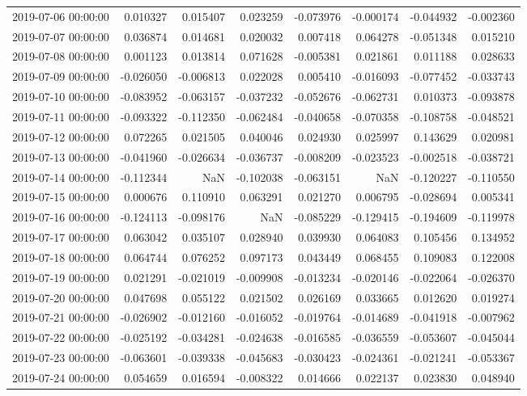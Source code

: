 \begin{tabular}{lrrrrrrr}
2019-07-06 00:00:00 & 0.010327 & 0.015407 & 0.023259 & -0.073976 & -0.000174 & -0.044932 & -0.002360 \\
2019-07-07 00:00:00 & 0.036874 & 0.014681 & 0.020032 & 0.007418 & 0.064278 & -0.051348 & 0.015210 \\
2019-07-08 00:00:00 & 0.001123 & 0.013814 & 0.071628 & -0.005381 & 0.021861 & 0.011188 & 0.028633 \\
2019-07-09 00:00:00 & -0.026050 & -0.006813 & 0.022028 & 0.005410 & -0.016093 & -0.077452 & -0.033743 \\
2019-07-10 00:00:00 & -0.083952 & -0.063157 & -0.037232 & -0.052676 & -0.062731 & 0.010373 & -0.093878 \\
2019-07-11 00:00:00 & -0.093322 & -0.112350 & -0.062484 & -0.040658 & -0.070358 & -0.108758 & -0.048521 \\
2019-07-12 00:00:00 & 0.072265 & 0.021505 & 0.040046 & 0.024930 & 0.025997 & 0.143629 & 0.020981 \\
2019-07-13 00:00:00 & -0.041960 & -0.026634 & -0.036737 & -0.008209 & -0.023523 & -0.002518 & -0.038721 \\
2019-07-14 00:00:00 & -0.112344 & NaN & -0.102038 & -0.063151 & NaN & -0.120227 & -0.110550 \\
2019-07-15 00:00:00 & 0.000676 & 0.110910 & 0.063291 & 0.021270 & 0.006795 & -0.028694 & 0.005341 \\
2019-07-16 00:00:00 & -0.124113 & -0.098176 & NaN & -0.085229 & -0.129415 & -0.194609 & -0.119978 \\
2019-07-17 00:00:00 & 0.063042 & 0.035107 & 0.028940 & 0.039930 & 0.064083 & 0.105456 & 0.134952 \\
2019-07-18 00:00:00 & 0.064744 & 0.076252 & 0.097173 & 0.043449 & 0.068455 & 0.109083 & 0.122008 \\
2019-07-19 00:00:00 & 0.021291 & -0.021019 & -0.009908 & -0.013234 & -0.020146 & -0.022064 & -0.026370 \\
2019-07-20 00:00:00 & 0.047698 & 0.055122 & 0.021502 & 0.026169 & 0.033665 & 0.012620 & 0.019274 \\
2019-07-21 00:00:00 & -0.026902 & -0.012160 & -0.016052 & -0.019764 & -0.014689 & -0.041918 & -0.007962 \\
2019-07-22 00:00:00 & -0.025192 & -0.034281 & -0.024638 & -0.016585 & -0.036559 & -0.053607 & -0.045044 \\
2019-07-23 00:00:00 & -0.063601 & -0.039338 & -0.045683 & -0.030423 & -0.024361 & -0.021241 & -0.053367 \\
2019-07-24 00:00:00 & 0.054659 & 0.016594 & -0.008322 & 0.014666 & 0.022137 & 0.023830 & 0.048940 \\

\end{tabular}
